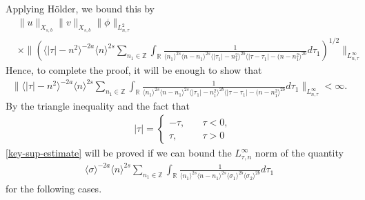 \documentclass[12pt,reqno]{amsart}
\numberwithin{equation}{section}  %
\numberwithin{figure}{section}
\newcommand{\rr}{\mathbb{R}}
\newcommand{\zz}{\mathbb{Z}}
\theoremstyle{plain}
\theoremstyle{definition}
\theoremstyle{remark}
\begin{document}
%
Applying H{\"o}lder, we bound this by 
%
%
\begin{equation*}
	\begin{split}
    & \|u\|_{X_{s,b}} \|v\|_{X_{s,b}} \| \phi \|_{L^{2}_{n, \tau}}
    \\
    & \times \|\left( \langle | \tau | - n^{2} \rangle ^{-2a} \langle n
    \rangle ^{2s}
\sum_{n_{1} \in \zz} \int_{\rr} \frac{1}{ \langle n_{1} \rangle ^{2s} \langle
n-n_{1} \rangle ^{2s} \langle | \tau_{1}|-n_{1}^{2} \rangle^{2b} \langle  |\tau -
    \tau_{1} | -(n - n_{1}^{2}
    \rangle ^{2b} } d \tau_1 \right)^{1/2} \|_{L^\infty_{n, \tau}}
	\end{split}
\end{equation*}
%
%
Hence, to complete the proof, it will be enough
to show that 
%
%
%
%
\begin{equation}
  \label{key-sup-estimate}
	\begin{split}
		 \| \langle | \tau | - n^{2} \rangle ^{-2a} \langle n
    \rangle ^{2s}
\sum_{n_{1} \in \zz} \int_{\rr} \frac{1}{  \langle n_{1} \rangle ^{2s} \langle
n-n_{1} \rangle ^{2s} \langle | \tau_{1}|-n_{1}^{2} \rangle^{2b}  \langle  |\tau -
    \tau_{1} | -(n - n_{1}^{2}
    \rangle ^{2b} } d \tau_1 \|_{L^\infty_{n, \tau}} < \infty.
	\end{split}
\end{equation}
%
%
By the triangle inequality and the fact that 
%
%
\begin{equation*}
\begin{split}
& | \tau | =
\begin{cases}
  - \tau, \quad & \tau < 0, 
\\
\tau, \quad & \tau > 0
\end{cases}
\end{split}
\end{equation*}
%
%
\eqref{key-sup-estimate} will be proved if we can bound the
$L^{\infty}_{\tau, n}$ norm of the quantity
%
%
\begin{equation}
  \label{sup-est-gen}
\begin{split}
		  \langle \sigma \rangle ^{-2a} \langle n
    \rangle ^{2s}
\sum_{n_{1} \in \zz} \int_{\rr} \frac{1}{ \langle n_{1} \rangle ^{2s} \langle n-n_{1} \rangle ^{2s} 
\langle \sigma_{1} \rangle^{2b} \langle  \sigma_{2} \rangle^{2b} }
d \tau_1 
	\end{split}
\end{equation}
%
for the following cases.
\end{document}
